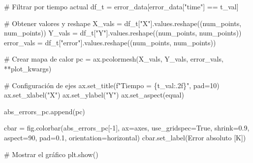 \documentclass[
  spanish,
  us-letterpaper,
]{scrreprt}
\newenvironment{Shaded}{\begin{snugshade}}{\end{snugshade}}
\newcommand{\CommentTok}[1]{\textcolor[rgb]{0.37,0.37,0.37}{#1}}
\newcommand{\DecValTok}[1]{\textcolor[rgb]{0.68,0.00,0.00}{#1}}
\newcommand{\FloatTok}[1]{\textcolor[rgb]{0.68,0.00,0.00}{#1}}
\newcommand{\NormalTok}[1]{\textcolor[rgb]{0.00,0.23,0.31}{#1}}
\newcommand{\OperatorTok}[1]{\textcolor[rgb]{0.37,0.37,0.37}{#1}}
\newcommand{\SpecialCharTok}[1]{\textcolor[rgb]{0.37,0.37,0.37}{#1}}
\newcommand{\SpecialStringTok}[1]{\textcolor[rgb]{0.13,0.47,0.30}{#1}}
\newcommand{\StringTok}[1]{\textcolor[rgb]{0.13,0.47,0.30}{#1}}
\newcommand{\VariableTok}[1]{\textcolor[rgb]{0.07,0.07,0.07}{#1}}
\theoremstyle{plain}
\theoremstyle{definition}
\theoremstyle{remark}
\begin{document}
\begin{Shaded}
\begin{Highlighting}[]
    \CommentTok{\# Filtrar por tiempo actual}
\NormalTok{    df\_t }\OperatorTok{=}\NormalTok{ error\_data[error\_data[}\StringTok{"time"}\NormalTok{] }\OperatorTok{==}\NormalTok{ t\_val]}
    
    \CommentTok{\# Obtener valores y reshape}
\NormalTok{    X\_vals }\OperatorTok{=}\NormalTok{ df\_t[}\StringTok{"X"}\NormalTok{].values.reshape((num\_points, num\_points))}
\NormalTok{    Y\_vals }\OperatorTok{=}\NormalTok{ df\_t[}\StringTok{"Y"}\NormalTok{].values.reshape((num\_points, num\_points))}
\NormalTok{    error\_vals }\OperatorTok{=}\NormalTok{ df\_t[}\StringTok{"error"}\NormalTok{].values.reshape((num\_points, num\_points))}
    
    \CommentTok{\# Crear mapa de calor}
\NormalTok{    pc }\OperatorTok{=}\NormalTok{ ax.pcolormesh(X\_vals, Y\_vals, error\_vals, }\OperatorTok{**}\NormalTok{plot\_kwargs)}
    
    \CommentTok{\# Configuración de ejes}
\NormalTok{    ax.set\_title(}\SpecialStringTok{f"Tiempo = }\SpecialCharTok{\{}\NormalTok{t\_val}\SpecialCharTok{:.2f\}}\SpecialStringTok{"}\NormalTok{, pad}\OperatorTok{=}\DecValTok{10}\NormalTok{)}
\NormalTok{    ax.set\_xlabel(}\StringTok{"X"}\NormalTok{)}
\NormalTok{    ax.set\_ylabel(}\StringTok{"Y"}\NormalTok{)}
\NormalTok{    ax.set\_aspect(}\StringTok{\textquotesingle{}equal\textquotesingle{}}\NormalTok{)}

\NormalTok{    abs\_errors\_pc.append(pc)}

\NormalTok{cbar }\OperatorTok{=}\NormalTok{ fig.colorbar(abs\_errors\_pc[}\OperatorTok{{-}}\DecValTok{1}\NormalTok{], ax}\OperatorTok{=}\NormalTok{axes,}
\NormalTok{                    use\_gridspec}\OperatorTok{=}\VariableTok{True}\NormalTok{, shrink}\OperatorTok{=}\FloatTok{0.9}\NormalTok{,}
\NormalTok{                    aspect}\OperatorTok{=}\DecValTok{90}\NormalTok{, pad}\OperatorTok{=}\FloatTok{0.1}\NormalTok{, orientation}\OperatorTok{=}\StringTok{\textquotesingle{}horizontal\textquotesingle{}}\NormalTok{)}
\NormalTok{cbar.set\_label(}\StringTok{\textquotesingle{}Error absoluto [K]\textquotesingle{}}\NormalTok{)}

\CommentTok{\# Mostrar el gráfico}
\NormalTok{plt.show()}
\end{Highlighting}
\end{Shaded}
\end{document}
